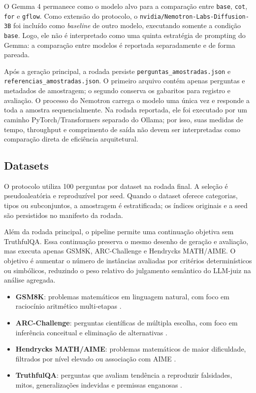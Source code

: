 \documentclass[12pt]{article}
\begin{document}
O Gemma 4 permanece como o modelo alvo para a compara\c{c}\~ao entre \texttt{base}, \texttt{cot}, \texttt{for} e \texttt{gflow}. Como extens\~ao do protocolo, o \texttt{nvidia/Nemotron-Labs-Diffusion-3B} foi inclu\'ido como \emph{baseline} de outro modelo, executando somente a condi\c{c}\~ao \texttt{base}. Logo, ele n\~ao \'{e} interpretado como uma quinta estrat\'egia de prompting do Gemma: a compara\c{c}\~ao entre modelos \'{e} reportada separadamente e de forma pareada.

Ap\'os a gera\c{c}\~ao principal, a rodada persiste \texttt{perguntas\_amostradas.json} e \texttt{referencias\_amostradas.json}. O primeiro arquivo cont\'em apenas perguntas e metadados de amostragem; o segundo conserva os gabaritos para registro e avalia\c{c}\~ao. O processo do Nemotron carrega o modelo uma \'unica vez e responde a toda a amostra sequencialmente. Na rodada reportada, ele foi executado por um caminho PyTorch/Transformers separado do Ollama; por isso, suas medidas de tempo, throughput e comprimento de saída não devem ser interpretadas como compara\c{c}\~ao direta de efici\^encia arquitetural.

\subsection{Datasets}

O protocolo utiliza 100 perguntas por dataset na rodada final. A seleção é pseudoaleatória e reproduzível por seed. Quando o dataset oferece categorias, tipos ou subconjuntos, a amostragem é estratificada; os índices originais e a seed são persistidos no manifesto da rodada.

Além da rodada principal, o pipeline permite uma continuação objetiva sem TruthfulQA. Essa continuação preserva o mesmo desenho de geração e avaliação, mas executa apenas GSM8K, ARC-Challenge e Hendrycks MATH/AIME. O objetivo é aumentar o número de instâncias avaliadas por critérios determinísticos ou simbólicos, reduzindo o peso relativo do julgamento semântico do LLM-juiz na análise agregada.

\begin{itemize}
\item \textbf{GSM8K}: problemas matemáticos em linguagem natural, com foco em raciocínio aritmético multi-etapas \cite{cobbe2021}.
\item \textbf{ARC-Challenge}: perguntas científicas de múltipla escolha, com foco em inferência conceitual e eliminação de alternativas \cite{clark2018}.
\item \textbf{Hendrycks MATH/AIME}: problemas matemáticos de maior dificuldade, filtrados por nível elevado ou associação com AIME \cite{hendrycks2021}.
\item \textbf{TruthfulQA}: perguntas que avaliam tendência a reproduzir falsidades, mitos, generalizações indevidas e premissas enganosas \cite{lin2022}.
\end{itemize}
\end{document}
